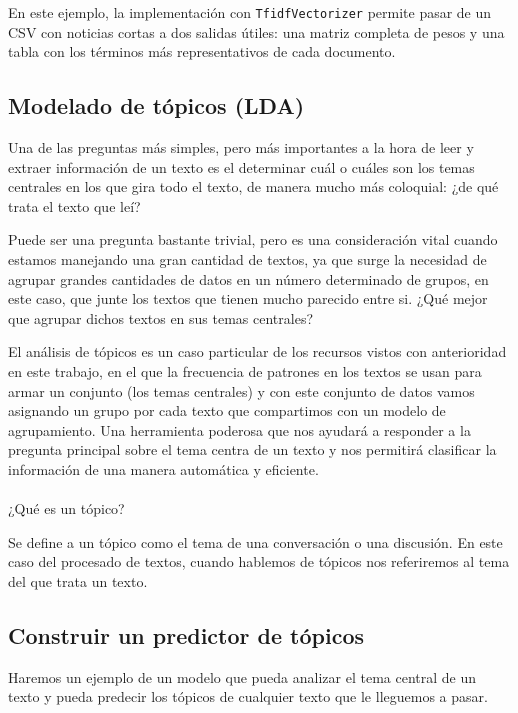 \documentclass[
  spanish,
  letterpaper,
  DIV=11,
  numbers=noendperiod]{scrartcl}
\makeatletter
\let\oldparagraph\paragraph
\renewcommand{\paragraph}{
    \@ifstar
      \xxxParagraphStar
      \xxxParagraphNoStar
  }
\newcommand{\xxxParagraphStar}[1]{\oldparagraph*{#1}\mbox{}}
\newcommand{\xxxParagraphNoStar}[1]{\oldparagraph{#1}\mbox{}}
\makeatother
\begin{document}
En este ejemplo, la implementación con \texttt{TfidfVectorizer} permite
pasar de un CSV con noticias cortas a dos salidas útiles: una matriz
completa de pesos y una tabla con los términos más representativos de
cada documento.

\subsection{Modelado de tópicos (LDA)}\label{modelado-de-tuxf3picos-lda}

Una de las preguntas más simples, pero más importantes a la hora de leer
y extraer información de un texto es el determinar cuál o cuáles son los
temas centrales en los que gira todo el texto, de manera mucho más
coloquial: ¿de qué trata el texto que leí?

Puede ser una pregunta bastante trivial, pero es una consideración vital
cuando estamos manejando una gran cantidad de textos, ya que surge la
necesidad de agrupar grandes cantidades de datos en un número
determinado de grupos, en este caso, que junte los textos que tienen
mucho parecido entre si. ¿Qué mejor que agrupar dichos textos en sus
temas centrales?

El análisis de tópicos es un caso particular de los recursos vistos con
anterioridad en este trabajo, en el que la frecuencia de patrones en los
textos se usan para armar un conjunto (los temas centrales) y con este
conjunto de datos vamos asignando un grupo por cada texto que
compartimos con un modelo de agrupamiento. Una herramienta poderosa que
nos ayudará a responder a la pregunta principal sobre el tema centra de
un texto y nos permitirá clasificar la información de una manera
automática y eficiente.

\paragraph{¿Qué es un tópico?}\label{quuxe9-es-un-tuxf3pico}

Se define a un tópico como el tema de una conversación o una discusión.
En este caso del procesado de textos, cuando hablemos de tópicos nos
referiremos al tema del que trata un texto.

\subsection{Construir un predictor de
tópicos}\label{construir-un-predictor-de-tuxf3picos}

Haremos un ejemplo de un modelo que pueda analizar el tema central de un
texto y pueda predecir los tópicos de cualquier texto que le lleguemos a
pasar.
\end{document}
